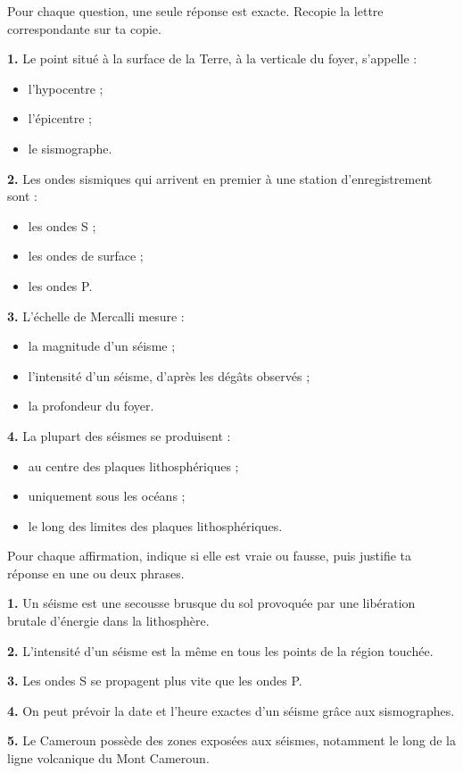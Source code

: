 \documentclass[11pt]{article}
\begin{document}
\begin{exercice}
Pour chaque question, une seule réponse est exacte. Recopie la lettre correspondante sur ta copie.

\textbf{1.} Le point situé à la surface de la Terre, à la verticale du foyer, s'appelle :
\begin{itemize}
\item[a)] l'hypocentre ;
\item[b)] l'épicentre ;
\item[c)] le sismographe.
\end{itemize}

\textbf{2.} Les ondes sismiques qui arrivent en premier à une station d'enregistrement sont :
\begin{itemize}
\item[a)] les ondes S ;
\item[b)] les ondes de surface ;
\item[c)] les ondes P.
\end{itemize}

\textbf{3.} L'échelle de Mercalli mesure :
\begin{itemize}
\item[a)] la magnitude d'un séisme ;
\item[b)] l'intensité d'un séisme, d'après les dégâts observés ;
\item[c)] la profondeur du foyer.
\end{itemize}

\textbf{4.} La plupart des séismes se produisent :
\begin{itemize}
\item[a)] au centre des plaques lithosphériques ;
\item[b)] uniquement sous les océans ;
\item[c)] le long des limites des plaques lithosphériques.
\end{itemize}
\end{exercice}

\begin{exercice}
Pour chaque affirmation, indique si elle est vraie ou fausse, puis justifie ta réponse en une ou deux phrases.

\textbf{1.} Un séisme est une secousse brusque du sol provoquée par une libération brutale d'énergie dans la lithosphère.

\textbf{2.} L'intensité d'un séisme est la même en tous les points de la région touchée.

\textbf{3.} Les ondes S se propagent plus vite que les ondes P.

\textbf{4.} On peut prévoir la date et l'heure exactes d'un séisme grâce aux sismographes.

\textbf{5.} Le Cameroun possède des zones exposées aux séismes, notamment le long de la ligne volcanique du Mont Cameroun.
\end{exercice}
\end{document}

